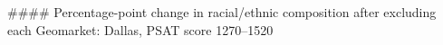 #### Percentage-point change in racial/ethnic composition after excluding each Geomarket: Dallas, PSAT score 1270–1520
